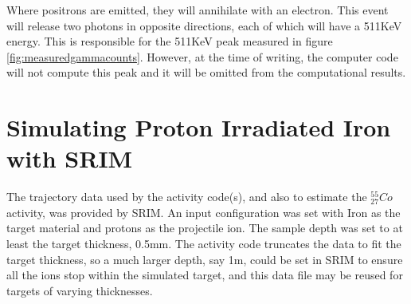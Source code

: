 Where positrons are emitted, they will annihilate with an electron.  This event will release two photons in opposite directions, each of which will have a 511KeV energy.  This is responsible for the 511KeV peak measured in figure \ref{fig:measuredgammacounts}.  However, at the time of writing, the computer code will not compute this peak and it will be omitted from the computational results.





\FloatBarrier
\section[Simulating with SRIM - Iron]{Simulating Proton Irradiated Iron with SRIM}

The trajectory data used by the activity code(s), and also to estimate the ${}^{55}_{27} Co$ activity, was provided by SRIM.  An input configuration was set with Iron as the target material and protons as the projectile ion.  The sample depth was set to at least the target thickness, 0.5mm.  The activity code truncates the data to fit the target thickness, so a much larger depth, say 1m, could be set in SRIM to ensure all the ions stop within the simulated target, and this data file may be reused for targets of varying thicknesses.

